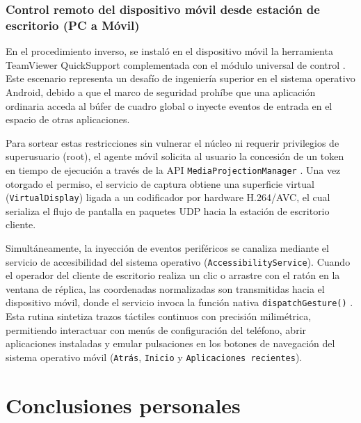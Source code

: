 \documentclass[12pt]{article}
\begin{document}
\subsubsection{Control remoto del dispositivo móvil desde estación de escritorio (PC a Móvil)}

En el procedimiento inverso, se instaló en el dispositivo móvil la herramienta TeamViewer QuickSupport complementada con el módulo universal de control \parencite{teamviewerMobileGuide}. Este escenario representa un desafío de ingeniería superior en el sistema operativo Android, debido a que el marco de seguridad prohíbe que una aplicación ordinaria acceda al búfer de cuadro global o inyecte eventos de entrada en el espacio de otras aplicaciones.

Para sortear estas restricciones sin vulnerar el núcleo ni requerir privilegios de superusuario (root), el agente móvil solicita al usuario la concesión de un token en tiempo de ejecución a través de la API \texttt{MediaProjectionManager} \parencite{androidMediaProjection}. Una vez otorgado el permiso, el servicio de captura obtiene una superficie virtual (\texttt{VirtualDisplay}) ligada a un codificador por hardware H.264/AVC, el cual serializa el flujo de pantalla en paquetes UDP hacia la estación de escritorio cliente.

Simultáneamente, la inyección de eventos periféricos se canaliza mediante el servicio de accesibilidad del sistema operativo (\texttt{AccessibilityService}). Cuando el operador del cliente de escritorio realiza un clic o arrastre con el ratón en la ventana de réplica, las coordenadas normalizadas son transmitidas hacia el dispositivo móvil, donde el servicio invoca la función nativa \texttt{dispatchGesture()} \parencite{androidAccessibilityGesture}. Esta rutina sintetiza trazos táctiles continuos con precisión milimétrica, permitiendo interactuar con menús de configuración del teléfono, abrir aplicaciones instaladas y emular pulsaciones en los botones de navegación del sistema operativo móvil (\texttt{Atrás}, \texttt{Inicio} y \texttt{Aplicaciones recientes}).

\section{Conclusiones personales}\label{sec:conclusionesPersonales}
\end{document}
